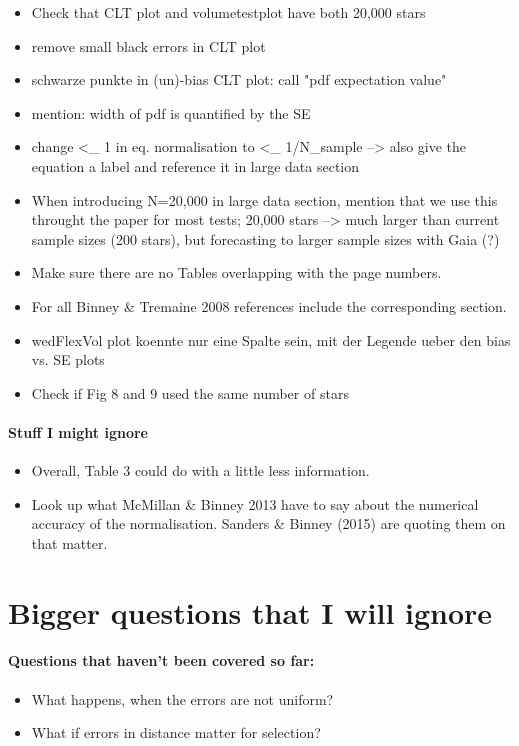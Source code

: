 \begin{itemize}
\item Check that CLT plot and volumetestplot have both 20,000 stars
\item remove small black errors in CLT plot
\item schwarze punkte in (un)-bias CLT plot: call "pdf expectation value"
\item mention: width of pdf is quantified by the SE
\item change <_ 1 in eq. normalisation to <_ 1/N_sample --> also give the equation a label and reference it in large data section
\item When introducing N=20,000 in large data section, mention that we use this throught the paper for most tests; 20,000 stars --> much larger than current sample sizes (200 stars), but forecasting to larger sample sizes with Gaia (?)
\item Make sure there are no Tables overlapping with the page numbers.
\item For all Binney \& Tremaine 2008 references include the corresponding section.
\item wedFlexVol plot koennte nur eine Spalte sein, mit der Legende ueber den bias vs. SE plots
\item Check if Fig 8 and 9 used the same number of stars
\end{itemize}

\paragraph{Stuff I might ignore}
\begin{itemize}
\item Overall, Table 3 could do with a little less information.
\item Look up what McMillan \& Binney 2013 have to say about the numerical accuracy of the normalisation. Sanders \& Binney (2015) are quoting them on that matter.
\end{itemize}



\section{Bigger questions that I will ignore}

\paragraph{Questions that haven't been covered so far:}
\begin{itemize}
\item What happens, when the errors are not uniform?
\item What if errors in distance matter for selection?
\end{itemize}

